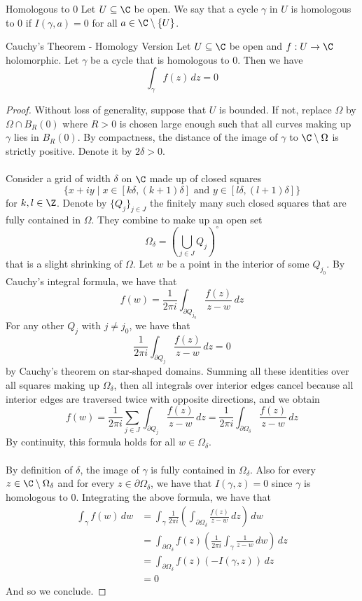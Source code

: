 \documentclass[a4paper]{article}
\begin{document}
\begin{defn}{Homologous to $0$}{} Let $U\subseteq\C$ be open. We say that a cycle $\gamma$ in $U$ is homologous to $0$ if $I(\gamma,a)=0$ for all $a\in\C\setminus\{U\}$. 
\end{defn}

\begin{thm}{Cauchy's Theorem - Homology Version}{} Let $U\subseteq\C$ be open and $f:U\to\C$ holomorphic. Let $\gamma$ be a cycle that is homologous to $0$. Then we have $$\int_\gamma f(z)\,dz=0$$ \tcbline
\begin{proof}
Without loss of generality, suppose that $U$ is bounded. If not, replace $\Omega$ by $\Omega\cap B_R(0)$ where $R>0$ is chosen large enough such that all curves making up $\gamma$ lies in $B_R(0)$. By compactness, the distance of the image of $\gamma$ to $\C\setminus\Omega$ is strictly positive. Denote it by $2\delta>0$. \\~\\

Consider a grid of width $\delta$ on $\C$ made up of closed squares $$\{x+iy\;|\;x\in[k\delta,(k+1)\delta]\text{ and }y\in[l\delta,(l+1)\delta]\}$$ for $k,l\in\Z$. Denote by $\{Q_j\}_{j\in J}$ the finitely many such closed squares that are fully contained in $\Omega$. They combine to make up an open set $$\Omega_\delta=\left(\bigcup_{j\in J}Q_j\right)^\circ$$ that is a slight shrinking of $\Omega$. Let $w$ be a point in the interior of some $Q_{j_0}$. By Cauchy's integral formula, we have that $$f(w)=\frac{1}{2\pi i}\int_{\partial Q_{j_0}}\frac{f(z)}{z-w}\,dz$$ For any other $Q_j$ with $j\neq j_0$, we have that $$\frac{1}{2\pi i}\int_{\partial Q_j}\frac{f(z)}{z-w}\,dz=0$$ by Cauchy's theorem on star-shaped domains. Summing all these identities over all squares making up $\Omega_\delta$, then all integrals over interior edges cancel because all interior edges are traversed twice with opposite directions, and we obtain $$f(w)=\frac{1}{2\pi i}\sum_{j\in J}\int_{\partial Q_j}\frac{f(z)}{z-w}\,dz=\frac{1}{2\pi i}\int_{\partial \Omega_\delta}\frac{f(z)}{z-w}\,dz$$ By continuity, this formula holds for all $w\in\Omega_\delta$. \\~\\

By definition of $\delta$, the image of $\gamma$ is fully contained in $\Omega_\delta$. Also for every $z\in\C\setminus\Omega_\delta$ and for every $z\in\partial\Omega_\delta$, we have that $I(\gamma,z)=0$ since $\gamma$ is homologous to $0$. Integrating the above formula, we have that 
\begin{align*}
\int_\gamma f(w)\,dw&=\int_{\gamma}\frac{1}{2\pi i}\left(\int_{\partial\Omega_\delta}\frac{f(z)}{z-w}\,dz\right)\,dw\\
&=\int_{\partial\Omega_\delta}f(z)\left(\frac{1}{2\pi i}\int_\gamma\frac{1}{z-w}\,dw\right)\,dz\\
&=\int_{\partial\Omega_\delta}f(z)(-I(\gamma,z))\,dz\\
&=0
\end{align*}
And so we conclude. 
\end{proof}
\end{thm}
\end{document}
